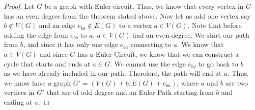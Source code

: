 \documentclass[12pt, fullpage]{article}
\begin{document}
\begin{proof}	
	Let $G$ be a graph with Euler circuit. Thus, we know that every vertex in $G$ has an even degree from the theorem stated above. Now let us add one vertex say $b \notin V(G) $ and an edge $e_{ba} \notin E(G)$ to a vertex $a \in V(G)$. Note that before adding the edge  from $e_{ba}$ to $a$, $a \in V(G)$ had an even degree. We start our path from $b$, and since it has only one edge $e_{ba}$ connecting to $a$. We know that $a \in V(G)$ and since $G$ has a Euler Circuit, we know that we can construct a cycle that starts and ends at $a \in G$. We cannot use the edge $e_{ba}$ to go back to $b$ as we have already included in our path. Therefore, the path will end at $a$. Thus, we know have a graph $G' = (V(G) + b, E(G) + e_{ba})$, where $a$ and $b$ are two vertices in $G'$ that are of odd degree and an Euler Path starting from $b$ and ending at $a$.

\end{proof}
\end{document}

